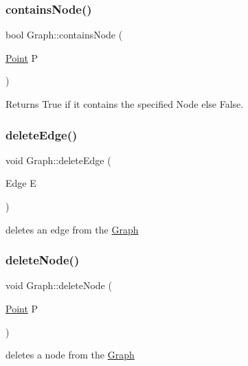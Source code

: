 \subsubsection{\texorpdfstring{contains\+Node()}{containsNode()}}
{\footnotesize\ttfamily bool Graph\+::contains\+Node (\begin{DoxyParamCaption}\item[{\mbox{\hyperlink{class_point}{Point}}}]{P }\end{DoxyParamCaption})}



Returns True if it contains the specified Node else False. 

\mbox{\label{class_graph_a39031d4b9f6527501333e612cb91cca6}} 
\subsubsection{\texorpdfstring{delete\+Edge()}{deleteEdge()}}
{\footnotesize\ttfamily void Graph\+::delete\+Edge (\begin{DoxyParamCaption}\item[{Edge}]{E }\end{DoxyParamCaption})}



deletes an edge from the \mbox{\hyperlink{class_graph}{Graph}} 

\mbox{\label{class_graph_a74d50f92f6f2291675020e038132c85f}} 
\subsubsection{\texorpdfstring{delete\+Node()}{deleteNode()}}
{\footnotesize\ttfamily void Graph\+::delete\+Node (\begin{DoxyParamCaption}\item[{\mbox{\hyperlink{class_point}{Point}}}]{P }\end{DoxyParamCaption})}



deletes a node from the \mbox{\hyperlink{class_graph}{Graph}} 

\mbox{\label{class_graph_a285f720a5e75fc099dcc32fd4a37786a}} 
